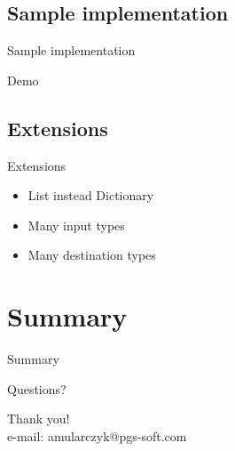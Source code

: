 \documentclass{beamer}
\begin{document}
\subsection*{Sample implementation}
\begin{frame}{Sample implementation}
\begin{center}
\Huge{Demo}
\end{center}
\end{frame}

\subsection*{Extensions}
\begin{frame}{Extensions}
\begin{center}
\Large{\begin{itemize}
	\item List instead Dictionary
	\item Many input types
	\item Many destination types
\end{itemize}}
\end{center}
\end{frame}	


\section{Summary}

\begin{frame}{}
\begin{center}
\Huge{Summary}
\end{center}
\end{frame}

\begin{frame}{Questions?}
\begin{center}
\Huge{Thank you!}\\
\Large{e-mail: amularczyk@pgs-soft.com}
\end{center}
\end{frame}
\end{document}
